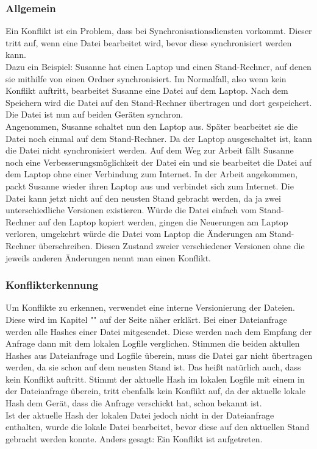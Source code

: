 \subsubsection{Allgemein}
Ein Konflikt ist ein Problem, dass bei Synchronisationsdiensten vorkommt. Dieser tritt auf, wenn eine Datei bearbeitet wird, bevor diese synchronisiert werden kann. \\
Dazu ein Beispiel: Susanne hat einen Laptop und einen Stand-Rechner, auf denen sie mithilfe von \sblit einen Ordner synchronisiert. Im Normalfall, also wenn kein Konflikt auftritt, bearbeitet Susanne eine Datei auf dem Laptop. Nach dem Speichern wird die Datei auf den Stand-Rechner übertragen und dort gespeichert. Die Datei ist nun auf beiden Geräten synchron.\\
Angenommen, Susanne schaltet nun den Laptop aus. Später bearbeitet sie die Datei noch einmal auf dem Stand-Rechner. Da der Laptop ausgeschaltet ist, kann die Datei nicht synchronisiert werden. Auf dem Weg zur Arbeit fällt Susanne noch eine Verbesserungsmöglichkeit der Datei ein und sie bearbeitet die Datei auf dem Laptop ohne einer Verbindung zum Internet. In der Arbeit angekommen, packt Susanne wieder ihren Laptop aus und verbindet sich zum Internet. Die Datei kann jetzt nicht auf den neusten Stand gebracht werden, da ja zwei unterschiedliche Versionen existieren. Würde die Datei einfach vom Stand-Rechner auf den Laptop kopiert werden, gingen die Neuerungen am Laptop verloren, umgekehrt würde die Datei vom Laptop die Änderungen am Stand-Rechner überschreiben. Diesen Zustand zweier verschiedener Versionen ohne die jeweils anderen Änderungen nennt man einen Konflikt.

\subsubsection{Konflikterkennung}\label{Konflikterkennung}
Um Konflikte zu erkennen, verwendet \sblit eine interne Versionierung der Dateien. Diese wird im Kapitel "" auf der Seite \pageref{Logfile} näher erklärt. Bei einer Dateianfrage  werden alle Hashes einer Datei mitgesendet. Diese werden nach dem Empfang der Anfrage dann mit dem lokalen Logfile verglichen. Stimmen die beiden aktullen Hashes aus Dateianfrage und Logfile überein, muss die Datei gar nicht übertragen werden, da sie schon auf dem neusten Stand ist. Das heißt natürlich auch, dass kein Konflikt auftritt. Stimmt der aktuelle Hash im lokalen Logfile mit einem in der Dateianfrage überein, tritt ebenfalls kein Konflikt auf, da der aktuelle lokale Hash dem Gerät, dass die Anfrage verschickt hat, schon bekannt ist. \\
Ist der aktuelle Hash der lokalen Datei jedoch nicht in der Dateianfrage enthalten, wurde die lokale Datei bearbeitet, bevor diese auf den aktuellen Stand gebracht werden konnte. Anders gesagt: Ein Konflikt ist aufgetreten.

